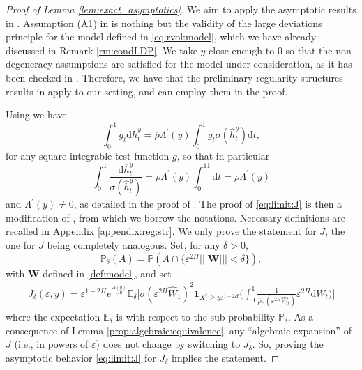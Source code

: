 \documentclass[11pt]{article}
\theoremstyle{plain}
\theoremstyle{definition}
\theoremstyle{remark}
\renewcommand{\bar}{\overline}
\renewcommand{\hat}{\widehat}
\newcommand{\dd}{\mathrm{d}}
\newcommand{\bE}{\mathbb{E}}
\newcommand{\bP}{\mathbb{P}}
\newcommand{\1}{\mathbf{1}}
\numberwithin{equation}{section}
\def\eps{\varepsilon}
\def\WW{\mathbf W}
\begin{document}
\begin{proof}[Proof of Lemma \ref{lem:exact_asymptotics}]
We aim to apply the asymptotic results in \cite{friz2018precise1}.
Assumption (A1) in \cite{friz2018precise1} is nothing but the validity of the large deviations principle for the model defined in \eqref{eq:rvol:model}, which we have already discussed in Remark \ref{rm:condLDP}.
We take $y$ close enough to $0$ so that the non-degeneracy assumptions \cite[Assumptions (A3), (A4), (A5)]{friz2018precise1} are satisfied for the model under consideration, as it has been checked in \cite[Section 7.1]{friz2018precise1}. Therefore, we have that the preliminary regularity structures results in \cite{friz2018precise1} apply to our setting, and can employ them in the proof. 

Using \cite[Proof of Lemma 3.4, Step 1]{friz2021short} we have
\[
\int_0^1  g_t \dd \bar{h}^y_t
=\bar{\rho} \Lambda^{\prime}(y)
\int_0^1 g_t \sigma(\hat{h}^y_t)  \dd t,
\]
for any square-integrable test function $g$,
so that in particular
\[
\int_0^1 \frac{ \dd \bar{h}^y_t}{ \sigma(\hat{h}^y_t) }
=\bar{\rho} \Lambda^{\prime}(y)
\int_0^11 \dd t
=
\bar{\rho} \Lambda^{\prime}(y)
\]
and $\Lambda^{\prime}(y)\neq 0$, as detailed in the proof of \cite[Theorem 6.1]{friz2018precise1}. The  proof of \eqref{eq:limit:J} is then a modification of \cite[Proposition 8.7]{friz2018precise1}, from which we borrow the notations. Necessary definitions are recalled in Appendix \ref{appendix:reg:str}. We only prove the statement for $J$,  the one for $\overline{J}$ being completely analogous.
Set, for any $\delta>0$, 
\begin{equation}\label{def:P:delta}
            \bP_\delta (A) = \bP ( A \cap \{  \eps^{2H} ||| \WW ||| < \delta     \} ),
\end{equation}
with $\WW$ defined in \eqref{def:model}, and set
\[
\begin{split}
J_\delta(\eps,y)
= \eps^{1-2H}
e^{\frac{\Lambda(y)}{\eps^{4H}}} 
\bE_\delta \Big[\sigma(\eps^{2H}\hat{W}_1)^2 \1_{X_1^\eps \geq y \eps^{1-2H}} \big( \int_0^1\frac{1}{\bar{\rho} \sigma(\eps^{2H} \hat{W}_t) } \eps^{2H}
\dd \bar{W}_t\big)\Big]
\end{split}
\]
where the expectation $\bE_\delta$ is with respect to the sub-probability $\mathbb{P}_\delta$.
As a consequence of Lemma \ref{prop:algebraic:equivalence},
any ``algebraic expansion'' of $J$ (i.e., in powers of $\eps$) does not change by switching to $J_\delta$. 
So, proving the asymptotic behavior \eqref{eq:limit:J} for $J_\delta$ implies the statement. 


\end{proof}
\end{document}
